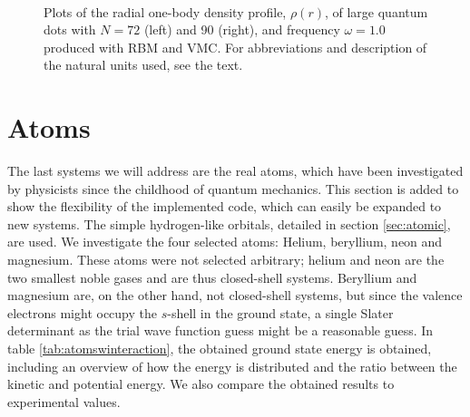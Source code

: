 \begin{figure}
	\centering
	\captionsetup[subfigure]{labelformat=empty}
	\hspace{-0.5cm}
	\\
	\caption{Plots of the radial one-body density profile, $\rho(r)$, of large quantum dots with $N=72$ (left) and 90 (right), and frequency $\omega=1.0$ produced with RBM and VMC. For abbreviations and description of the natural units used, see the text.}
	\label{fig:largedotsOB}
\end{figure}

\section{Atoms}\label{sec:atomsresults}
The last systems we will address are the real atoms, which have been investigated by physicists since the childhood of quantum mechanics. This section is added to show the flexibility of the implemented code, which can easily be expanded to new systems. The simple hydrogen-like orbitals, detailed in section \ref{sec:atomic}, are used. We investigate the four selected atoms: Helium, beryllium, neon and magnesium. These atoms were not selected arbitrary; helium and neon are the two smallest noble gases and are thus closed-shell systems. Beryllium and magnesium are, on the other hand, not closed-shell systems, but since the valence electrons might occupy the $s$-shell in the ground state, a single Slater determinant as the trial wave function guess might be a reasonable guess. In table \eqref{tab:atomswinteraction}, the obtained ground state energy is obtained, including an overview of how the energy is distributed and the ratio between the kinetic and potential energy. We also compare the obtained results to experimental values. 

